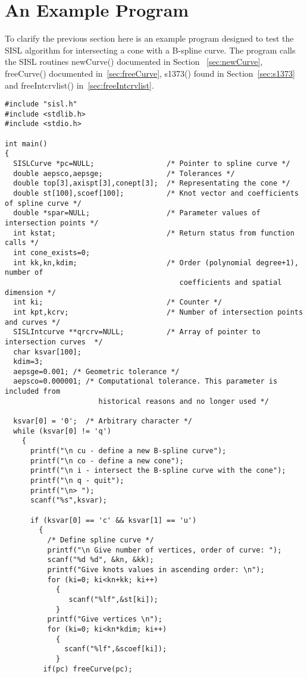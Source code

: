 \newpage
\section{An Example Program} \label{sec:exampleprog}

To clarify the previous section here is an example program designed to
test the SISL algorithm for intersecting a cone with
a B-spline curve. The program calls the SISL routines newCurve() documented in
Section ~\ref{sec:newCurve}, freeCurve() documented in~\ref{sec:freeCurve},
s1373() found in Section~\ref{sec:s1373} and freeIntcrvlist() in~\ref{sec:freeIntcrvlist}.

\begin{verbatim}
#include "sisl.h"
#include <stdlib.h>  
#include <stdio.h>

int main()
{
  SISLCurve *pc=NULL;                 /* Pointer to spline curve */
  double aepsco,aepsge;               /* Tolerances */
  double top[3],axispt[3],conept[3];  /* Representating the cone */
  double st[100],scoef[100];          /* Knot vector and coefficients of spline curve */
  double *spar=NULL;                  /* Parameter values of intersection points */
  int kstat;                          /* Return status from function calls */
  int cone_exists=0;
  int kk,kn,kdim;                     /* Order (polynomial degree+1), number of 
                                         coefficients and spatial dimension */
  int ki;                             /* Counter */
  int kpt,kcrv;                       /* Number of intersection points and curves */
  SISLIntcurve **qrcrv=NULL;          /* Array of pointer to intersection curves  */
  char ksvar[100];                    
  kdim=3;
  aepsge=0.001; /* Geometric tolerance */
  aepsco=0.000001; /* Computational tolerance. This parameter is included from 
                      historical reasons and no longer used */

  ksvar[0] = '0';  /* Arbitrary character */
  while (ksvar[0] != 'q')
    {
      printf("\n cu - define a new B-spline curve");
      printf("\n co - define a new cone");
      printf("\n i - intersect the B-spline curve with the cone");
      printf("\n q - quit");
      printf("\n> ");
      scanf("%s",ksvar);

      if (ksvar[0] == 'c' && ksvar[1] == 'u')
        {
          /* Define spline curve */
          printf("\n Give number of vertices, order of curve: ");
          scanf("%d %d", &kn, &kk);
          printf("Give knots values in ascending order: \n");
          for (ki=0; ki<kn+kk; ki++)
            {
               scanf("%lf",&st[ki]);
            }
          printf("Give vertices \n");
          for (ki=0; ki<kn*kdim; ki++)
            {
              scanf("%lf",&scoef[ki]);
            }
         if(pc) freeCurve(pc);


\end{verbatim}
